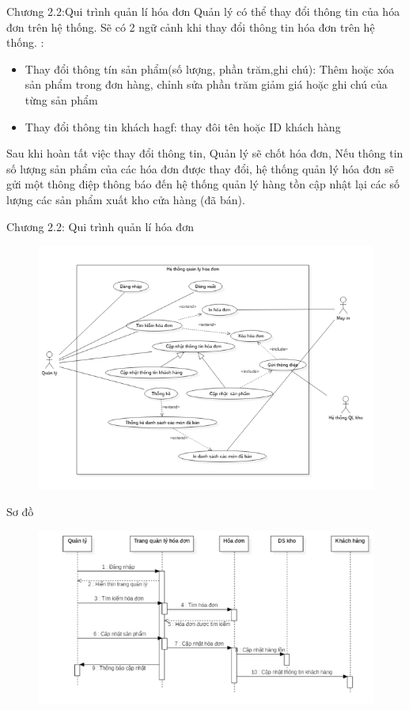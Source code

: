 \documentclass{beamer}
\begin{document}
\begin{frame}{Chương 2.2:Qui trình quản lí hóa đơn}
    Quản lý có thể thay đổi thông tin của hóa đơn trên hệ thống. Sẽ có 2 ngữ cảnh khi thay đổi thông tin hóa đơn trên hệ thống. :
    
    \begin{itemize}
        \item Thay đổi thông tín sản phẩm(số lượng, phần trăm,ghi chú): Thêm hoặc xóa sản phẩm trong đơn hàng, chỉnh sửa phần trăm giảm giá hoặc ghi chú của từng sản phẩm
        \item Thay đổi thông tin khách hagf: thay đôi tên hoặc ID khách hàng
    \end{itemize}
    Sau khi hoàn tất việc thay đổi thông tin, Quản lý sẽ chốt hóa đơn, Nếu thông tin số lượng sản phẩm của các hóa đơn được thay đổi, hệ thống quản lý hóa đơn sẽ gửi một thông điệp thông báo đến hệ thống quản lý hàng tồn cập nhật lại các số lượng các sản phẩm xuất kho cửa hàng (đã bán).
\end{frame}
\begin{frame}{Chương 2.2: Qui trình quản lí hóa đơn}
    \begin{figure}
        \centering
        \includegraphics[scale = 0.6]{5.png}
    \end{figure}
\end{frame}
\begin{frame}{Sơ đồ}
    \begin{figure}
    \centering
    \includegraphics[scale = 0.6]{9.png}

\end{figure}
\end{frame}
\end{document}
